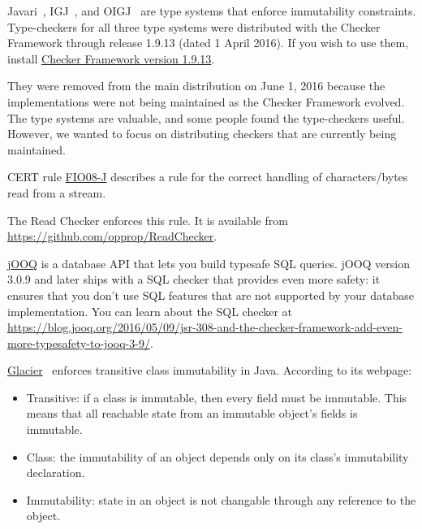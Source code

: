 
Javari~\cite{TschantzE2005}, IGJ~\cite{ZibinPAAKE2007}, and
OIGJ~\cite{ZibinPLAE2010} are type systems that enforce immutability
constraints.  Type-checkers for all three type systems were distributed
with the Checker Framework through release 1.9.13 (dated 1 April 2016).
If you wish to use them, install
\href{https://checkerframework.org/releases/1.9.13/}{Checker
  Framework version 1.9.13}.

They were removed from the main distribution on June 1, 2016 because the
implementations were not being maintained as the Checker Framework evolved.
The type systems are valuable, and some people found the type-checkers
useful.  However,
we wanted
to focus on distributing checkers that are currently being maintained.



CERT
rule \href{https://www.securecoding.cert.org/confluence/display/java/FIO08-J.+Distinguish+between+characters+or+bytes+read+from+a+stream+and+-1}{FIO08-J}
describes a rule for the correct handling of characters/bytes read
from a stream.

The Read Checker enforces this rule.
It is available from
\url{https://github.com/opprop/ReadChecker}.



\href{http://www.jooq.org/}{jOOQ} is a database API that lets you build
typesafe SQL queries.  jOOQ version 3.0.9 and later ships with a SQL
checker that provides even more safety:  it ensures that you don't
use SQL features that are not supported by your database
implementation.  You can learn about the SQL checker at
\url{https://blog.jooq.org/2016/05/09/jsr-308-and-the-checker-framework-add-even-more-typesafety-to-jooq-3-9/}.



\href{http://mcoblenz.github.io/Glacier/}{Glacier}~\cite{CoblenzNAMS2017}
enforces transitive class immutability in Java.  According to its webpage:

\begin{itemize}
\item
  Transitive: if a class is immutable, then every field must be
  immutable. This means that all reachable state from an immutable object's
  fields is immutable.
\item
  Class: the immutability of an object depends only on its class's
  immutability declaration.
\item
  Immutability: state in an object is not changable through any reference to
  the object.
\end{itemize}


